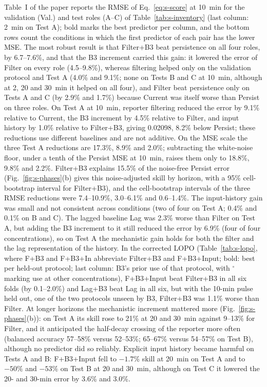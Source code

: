 \documentclass[conference]{IEEEtran}
\newcommand{\pr}[1]{\textsf{#1}}
\begin{document}
Table~I of the paper reports the RMSE of Eq.~\eqref{eq:s-score} at 10~min for the validation (Val.) and test roles (A--C) of Table~\ref{tab:s-inventory} (last column: 2~min on Test A); bold marks the best predictor per column, and the bottom rows count the conditions in which the first predictor of each pair has the lower MSE. The most robust result is that \pr{Filter+B3} beat persistence on all four roles, by 6.7--7.6\%, and that the B3 increment carried this gain: it lowered the error of \pr{Filter} on every role (4.5--9.8\%), whereas filtering helped only on the validation protocol and Test A (4.0\% and 9.1\%; none on Tests B and C at 10~min, although at 2, 20 and 30~min it helped on all four), and \pr{Filter} beat persistence only on Tests A and C (by 2.9\% and 1.7\%) because \pr{Current} was itself worse than \pr{Persist} on three roles. On Test A at 10~min, reporter filtering reduced the error by 9.1\% relative to \pr{Current}, the B3 increment by 4.5\% relative to \pr{Filter}, and input history by 1.0\% relative to \pr{Filter+B3}, giving 0.02098, 8.2\% below \pr{Persist}; these reductions use different baselines and are not additive. On the MSE scale the three Test A reductions are 17.3\%, 8.9\% and 2.0\%; subtracting the white-noise floor, under a tenth of the \pr{Persist} MSE at 10~min, raises them only to 18.8\%, 9.8\% and 2.2\%. \pr{Filter+B3} explains 15.5\% of the noise-free \pr{Persist} error (Fig.~\ref{fig:s-phases}(b) gives this noise-adjusted skill by horizon, with a 95\% cell-bootstrap interval for \pr{Filter+B3}), and the cell-bootstrap intervals of the three RMSE reductions were 7.4--10.9\%, 3.0--6.1\% and 0.6--1.4\%. The input-history gain was small and not consistent across conditions (two of four on Test A; 0.4\% and 0.1\% on B and C). The lagged baseline \pr{Lag} was 2.3\% worse than \pr{Filter} on Test A, but adding the B3 increment to it still reduced the error by 6.9\% (four of four concentrations), so on Test A the mechanistic gain holds for both the filter and the lag representation of the history. In the corrected LOPO (Table~\ref{tab:s-lopo}, where F+B3 and F+B3+In abbreviate \pr{Filter+B3} and \pr{F+B3+Input}; bold: best per held-out protocol; last column: B3's prior use of that protocol, with $^\circ$ marking use at other concentrations), \pr{F+B3+Input} beat \pr{Filter+B3} in all six folds (by 0.1--2.0\%) and \pr{Lag+B3} beat \pr{Lag} in all six, but with the 10-min pulse held out, one of the two protocols unseen by B3, \pr{Filter+B3} was 1.1\% worse than \pr{Filter}. At longer horizons the mechanistic increment mattered more (Fig.~\ref{fig:s-phases}(b)): on Test A its skill rose to 21\% at 20 and 30~min against 9--13\% for \pr{Filter}, and it anticipated the half-decay crossing of the reporter more often (balanced accuracy 57--58\% versus 52--53\%; 65--67\% versus 54--57\% on Test B), although no predictor did so reliably. Explicit input history became harmful on Tests A and B: \pr{F+B3+Input} fell to $-1.7\%$ skill at 20~min on Test A and to $-50\%$ and $-53\%$ on Test B at 20 and 30~min, although on Test C it lowered the 20- and 30-min error by 3.6\% and 3.0\%.
\end{document}
